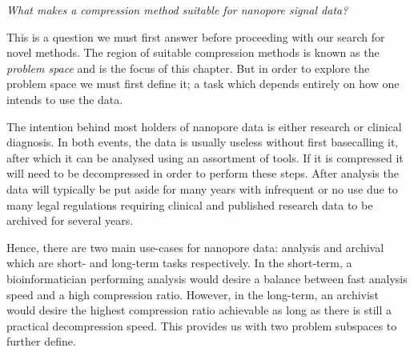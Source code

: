 

\textit{What makes a compression method suitable for nanopore signal data?}

This is a question we must first answer before proceeding with our search for
novel methods.
The region of suitable compression methods is known as the \textit{problem space} and
is the focus of this chapter. But in order to explore the problem space we must
first define it; a task which depends entirely on how one intends to use the
data.

The intention behind most holders of nanopore data is either research or
clinical diagnosis. In both events, the data is usually useless without first
basecalling it, after which it can be analysed using an assortment of tools.
If it is compressed it will need to be decompressed in order to
perform these steps. After analysis the data will typically be put aside for
many years with infrequent or no use due to many legal regulations requiring
clinical and published research data to be archived for several years.

Hence, there are two main use-cases for nanopore data: analysis and archival
which are short- and long-term tasks respectively. In the short-term, a
bioinformatician performing analysis would desire a balance between fast
analysis speed and a high compression ratio. However, in the long-term, an
archivist would desire the highest compression ratio achievable as long as there
is still a practical decompression speed. This provides us with two problem
subspaces to further define.

